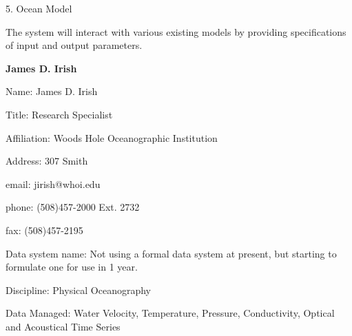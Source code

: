 \begin{description}
\item{5.}	Ocean Model

\noindent The system will interact with various existing models by providing 
specifications of input and output parameters.
\end{description}
\newpage

\begin{center}
\LARGE
{\bf  James D. Irish}
\end{center}
\large
{}
\normalsize
\smallskip
\begin{description}
\item{Name:}  James D. Irish
\item{Title:}  Research Specialist
\item{Affiliation:}  Woods Hole Oceanographic Institution
\item{Address:}  307 Smith
\item{email:}  jirish@whoi.edu
\item{phone:}  (508)457-2000 Ext. 2732
\item{fax:}  (508)457-2195
\end{description}
\medskip
\large
{}
\normalsize
\medskip
\begin{description}

\item{Data system name:}  Not using a formal data system at present, but 
starting to formulate one for use in 1 year.
\item{Discipline:}  Physical Oceanography
\item{Data Managed:}  Water Velocity, Temperature, Pressure, 
Conductivity, Optical and Acoustical Time Series
\end{description}

\medskip
\large
{}
\normalsize
\medskip

